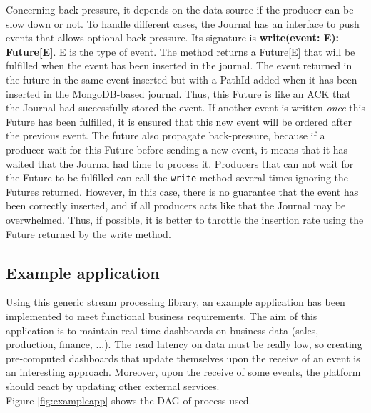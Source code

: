 Concerning back-pressure, it depends on the data source if the producer can be slow down or not. To handle different cases, the Journal has an interface to push events that allows optional back-pressure. Its signature is \textbf{write(event: E): Future[E]}. E is the type of event. The method returns a Future[E] that will be fulfilled when the event has been inserted in the journal. The event returned in the future in the same event inserted but with a PathId added when it has been inserted in the MongoDB-based journal.
Thus, this Future is like an ACK that the Journal had successfully stored the event. If another event is written \textit{once} this Future has been fulfilled, it is ensured
that this new event will be ordered after the previous event. The future also propagate back-pressure, because if a producer wait for this Future before sending a new event, it means that it has waited that the Journal had time to process it. Producers that can not wait for the Future to be fulfilled can call the \verb|write| method several times
ignoring the Futures returned. However, in this case, there is no guarantee that the event has been correctly inserted, and if all producers acts like that the Journal may be overwhelmed. Thus, if possible, it is better to throttle the insertion rate using the Future returned by the write method.

\subsection{Example application}

Using this generic stream processing library, an example application has been implemented to meet functional business requirements. The aim of this application is to
maintain real-time dashboards on business data (sales, production, finance, ...). The read latency on data must be really low, so creating pre-computed dashboards that
update themselves upon the receive of an event is an interesting approach. Moreover, upon the receive of some events, the platform should react by updating other external
services.
\\

Figure \ref{fig:exampleapp} shows the DAG of process used. 

